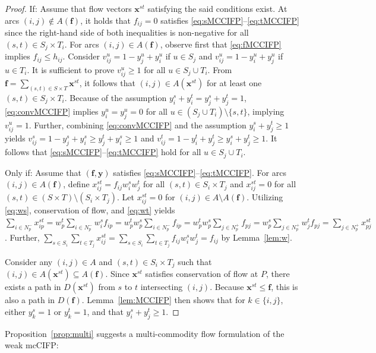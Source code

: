 \documentclass[pdflatex,sn-mathphys-num]{sn-jnl}%
\theoremstyle{thmstyleone}%
\begin{document}
\begin{proof}
If: Assume that flow vectors $\boldsymbol{x}^{st}$ satisfying the said conditions exist.
At arcs $(i,j)\notin A(\boldsymbol{f})$, it holds that $f_{ij}=0$ satisfies \eqref{eq:sMCCIFP}--\eqref{eq:tMCCIFP} since the right-hand side of both inequalities is non-negative for all $(s,t)\in S_j\times T_i$.
For arcs $(i,j)\in A(\boldsymbol{f})$, observe first that \eqref{eq:fMCCIFP} implies $f_{ij}\leq h_{ij}$.
 Consider $v_{ij}^u=1-y_j^u+y_i^u$ if $u\in S_j$ and $v_{ij}^u=1-y_i^u+y_j^u$ if $u\in T_i$. It is sufficient to prove $v_{ij}^u\geq 1$ for all $u\in S_j\cup T_i$.
From $\boldsymbol{f} = \sum_{(s,t)\in S\times T}\boldsymbol{x}^{st}$, it follows that $(i,j)\in A(\boldsymbol{x}^{st})$ for at least one $(s,t)\in S_j\times T_i$.
Because of the assumption $y_i^s+y_i^t=y_j^s+y_j^t=1$, \eqref{eq:convMCCIFP} implies $y_i^u=y_j^u=0$ for all $u\in(S_j\cup T_i)\setminus\{s,t\}$, implying $v_{ij}^u=1$.
Further, combining \eqref{eq:convMCCIFP} and the assumption $y_i^s+y_j^t\geq 1$ yields $v_{ij}^s=1-y_j^s+y_i^s\geq y_j^t+y_i^s\geq 1$ and $v_{ij}^t=1-y_i^t+y_j^t\geq y_i^s+y_j^t\geq 1$. 
It follows that \eqref{eq:sMCCIFP}--\eqref{eq:tMCCIFP} hold for all $u\in S_j\cup T_i$.

Only if: 
Assume that $(\boldsymbol{f},\boldsymbol{y})$ satisfies \eqref{eq:sMCCIFP}--\eqref{eq:tMCCIFP}.
For arcs $(i,j)\in A(\boldsymbol{f})$, define $x_{ij}^{st} = f_{ij}w_i^sw_j^t$ for all $(s,t)\in S_i\times T_j$ and $x_{ij}^{st}=0$ for all $(s,t)\in(S\times T)\setminus(S_i\times T_j)$.
Let $x_{ij}^{st}=0$ for $(i,j)\in A\setminus A(\boldsymbol{f})$.
Utilizing \eqref{eq:ws}, conservation of flow, and \eqref{eq:wt} yields $\sum_{i\in N_p^-}x_{ip}^{st} = w_p^t\sum_{i\in N_p^-}w_i^sf_{ip} = w_p^tw_p^s\sum_{i\in N_p^-}f_{ip} = w_p^tw_p^s\sum_{j\in N_p^+}f_{pj} = w_p^s\sum_{j\in N_p^+}w_j^tf_{pj} = \sum_{j\in N_p^+}x_{pj}^{st}$.
Further, $\sum_{s\in S_i}\sum_{t\in T_j}x_{ij}^{st}=\sum_{s\in S_i}\sum_{t\in T_j}f_{ij}w_i^sw_j^t=f_{ij}$ by Lemma~\ref{lem:w}.

Consider any $(i,j)\in A$ and $(s,t)\in S_i\times T_j$ such that $(i,j)\in A(\boldsymbol{x}^{st})\subseteq A(\boldsymbol{f})$.
Since $\boldsymbol{x}^{st}$ satisfies conservation of flow at $P$, there exists a path in $D(\boldsymbol{x}^{st})$ from $s$ to $t$ intersecting $(i,j)$.
Because $\boldsymbol{x}^{st}\leq\boldsymbol{f}$, this is also a path in $D(\boldsymbol{f})$.
Lemma~\ref{lem:MCCIFP} then shows that for $k\in\{i,j\}$, either $y_k^s=1$ or $y_k^t=1$,
and that $y_i^s+y_j^t\geq 1$.
\end{proof}
\noindent
Proposition~\ref{prop:multi} suggests a multi-commodity flow formulation of the weak mcCIFP:
\end{document}
